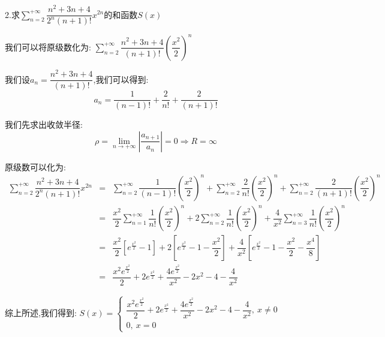 2.求$\sum\limits_{n=2}^{+\infty}\dfrac{n^2+3n+4}{2^n(n+1)!}x^{2n}$的和函数$S(x)$
\begin{solution}

	我们可以将原级数化为:  $\sum\limits_{n=2}^{+\infty}\dfrac{n^2+3n+4}{(n+1)!}(\dfrac{x^2}{2})^{n}$
	
	我们设$a_{n}=\dfrac{n^2+3n+4}{(n+1)!}$,我们可以得到:  
	$$a_{n}=\dfrac{1}{(n-1)!}+\dfrac{2}{n!}+\dfrac{2}{(n+1)!}$$
	
	我们先求出收敛半径:  
	$$\rho=\lim\limits_{n\rightarrow +\infty}|\dfrac{a_{n+1}}{a_{n}}|=0\Rightarrow R=\infty$$
	
	原级数可以化为:  
	\begin{eqnarray*}
		\sum\limits_{n=2}^{+\infty}\dfrac{n^2+3n+4}{2^n(n+1)!}x^{2n}&=&\sum\limits_{n=2}^{+\infty}\dfrac{1}{(n-1)!}(\dfrac{x^2}{2})^{n}+\sum\limits_{n=2}^{+\infty}\dfrac{2}{n!}(\dfrac{x^2}{2})^{n}+\sum\limits_{n=2}^{+\infty}\dfrac{2}{(n+1)!}(\dfrac{x^2}{2})^{n}\\
		&=&\dfrac{x^2}{2}\sum\limits_{n=1}^{+\infty}\dfrac{1}{n!}(\dfrac{x^2}{2})^{n}+2\sum\limits_{n=2}^{+\infty}\dfrac{1}{n!}(\dfrac{x^2}{2})^{n}+\dfrac{4}{x^2}\sum\limits_{n=3}^{+\infty}\dfrac{1}{n!}(\dfrac{x^2}{2})^{n}\\
		&=&\dfrac{x^2}{2}\left[e^{\frac{x^2}{2}}-1\right]+2\left[e^{\frac{x^2}{2}}-1-\dfrac{x^2}{2}\right]+\dfrac{4}{x^2}\left[ e^{\frac{x^2}{2}}-1-\dfrac{x^2}{2}-\dfrac{x^4}{8}\right]\\
		&=&\dfrac{x^2e^{\frac{x^2}{2}}}{2}+2e^{\frac{x^2}{2}}+\dfrac{4e^{\frac{x^2}{2}}}{x^2}-2x^2-4-\dfrac{4}{x^2}   
	\end{eqnarray*}

	综上所述,我们得到:  $S(x)=\left\lbrace
	\begin{array}{l}
		\dfrac{x^2e^{\frac{x^2}{2}}}{2}+2e^{\frac{x^2}{2}}+\dfrac{4e^{\frac{x^2}{2}}}{x^2}-2x^2-4-\dfrac{4}{x^2},\ x\neq 0\\
		0,\ x=0
	\end{array}
	\right. $
\end{solution}

